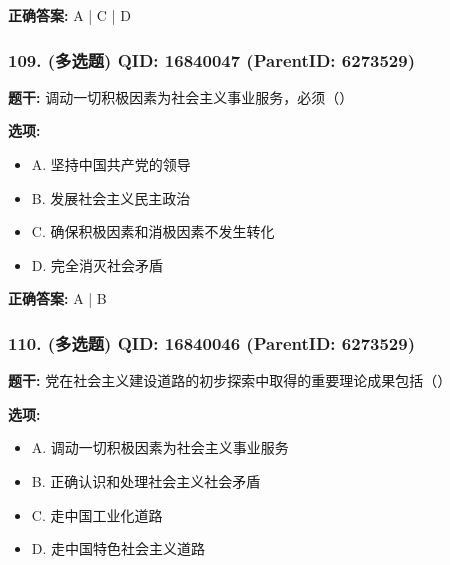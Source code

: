 \documentclass[12pt,UTF8]{ctexart}
\begin{document}
\textbf{正确答案:}
A | C | D

\vspace{0.3em}\hrulefill\vspace{0.7em}

\subsubsection*{109. (多选题) \small QID: 16840047 (ParentID: 6273529)}

\textbf{题干:}
调动一切积极因素为社会主义事业服务，必须（）



\textbf{选项:}
\begin{itemize}[leftmargin=*]

  \item A. 坚持中国共产党的领导

  \item B. 发展社会主义民主政治

  \item C. 确保积极因素和消极因素不发生转化

  \item D. 完全消灭社会矛盾

\end{itemize}

\textbf{正确答案:}
A | B

\vspace{0.3em}\hrulefill\vspace{0.7em}

\subsubsection*{110. (多选题) \small QID: 16840046 (ParentID: 6273529)}

\textbf{题干:}
党在社会主义建设道路的初步探索中取得的重要理论成果包括（）



\textbf{选项:}
\begin{itemize}[leftmargin=*]

  \item A. 调动一切积极因素为社会主义事业服务

  \item B. 正确认识和处理社会主义社会矛盾

  \item C. 走中国工业化道路

  \item D. 走中国特色社会主义道路

\end{itemize}
\end{document}

